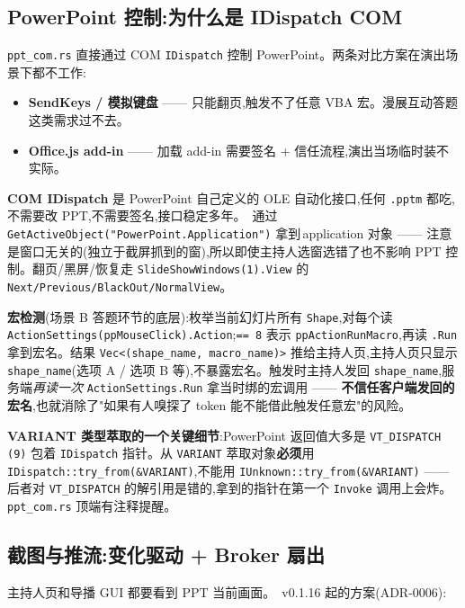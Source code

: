 \subsection{PowerPoint 控制:为什么是 IDispatch COM}

\texttt{ppt\_com.rs} 直接通过 COM \texttt{IDispatch} 控制 PowerPoint。两条对比方案在演出场景下都不工作:

\begin{itemize}
  \item \textbf{SendKeys / 模拟键盘} —— 只能翻页,触发不了任意 VBA 宏。漫展互动答题这类需求过不去。
  \item \textbf{Office.js add-in} —— 加载 add-in 需要签名 + 信任流程,演出当场临时装不实际。
\end{itemize}

\textbf{COM IDispatch} 是 PowerPoint 自己定义的 OLE 自动化接口,任何 \texttt{.pptm} 都吃,不需要改 PPT,不需要签名,接口稳定多年。\app\ 通过 \texttt{GetActiveObject("PowerPoint.Application")} 拿到\,application 对象 —— 注意是窗口无关的(独立于截屏抓到的窗),所以即使主持人选窗选错了也不影响 PPT 控制。翻页/黑屏/恢复走 \texttt{SlideShowWindows(1).View} 的 \texttt{Next/Previous/BlackOut/NormalView}。

\textbf{宏检测}(场景 B 答题环节的底层):枚举当前幻灯片所有 \texttt{Shape},对每个读 \texttt{ActionSettings(ppMouseClick).Action};\texttt{== 8} 表示 \texttt{ppActionRunMacro},再读 \texttt{.Run} 拿到宏名。结果 \texttt{Vec<(shape\_name, macro\_name)>} 推给主持人页,主持人页只显示 \texttt{shape\_name}(选项 A / 选项 B 等),不暴露宏名。触发时主持人发回 \texttt{shape\_name},服务端\textit{再读一次} \texttt{ActionSettings.Run} 拿当时绑的宏调用 —— \textbf{不信任客户端发回的宏名},也就消除了"如果有人嗅探了 token 能不能借此触发任意宏"的风险。

\textbf{VARIANT 类型萃取的一个关键细节}:PowerPoint 返回值大多是 \texttt{VT\_DISPATCH (9)} 包着 \texttt{IDispatch} 指针。从 \texttt{VARIANT} 萃取对象\textbf{必须}用 \texttt{IDispatch::try\_from(\&VARIANT)},不能用 \texttt{IUnknown::try\_from(\&VARIANT)} —— 后者对 \texttt{VT\_DISPATCH} 的解引用是错的,拿到的指针在第一个 \texttt{Invoke} 调用上会炸。\texttt{ppt\_com.rs} 顶端有注释提醒。

\subsection{截图与推流:变化驱动 + Broker 扇出}

主持人页和导播 GUI 都要看到 PPT 当前画面。\app\ v0.1.16 起的方案(ADR-0006):

